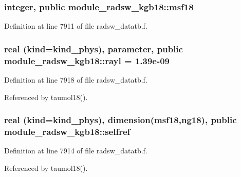\subsubsection[{\texorpdfstring{msf18}{msf18}}]{\setlength{\rightskip}{0pt plus 5cm}integer, public module\+\_\+radsw\+\_\+kgb18\+::msf18}\hypertarget{namespacemodule__radsw__kgb18_a1d74002f71710887e45df89d3897a10a}{}\label{namespacemodule__radsw__kgb18_a1d74002f71710887e45df89d3897a10a}


Definition at line 7911 of file radsw\+\_\+datatb.\+f.

\subsubsection[{\texorpdfstring{rayl}{rayl}}]{\setlength{\rightskip}{0pt plus 5cm}real (kind=kind\+\_\+phys), parameter, public module\+\_\+radsw\+\_\+kgb18\+::rayl = 1.\+39e-\/09}\hypertarget{namespacemodule__radsw__kgb18_a9cd3f07e259e4982c7ef2889fee6cccb}{}\label{namespacemodule__radsw__kgb18_a9cd3f07e259e4982c7ef2889fee6cccb}


Definition at line 7918 of file radsw\+\_\+datatb.\+f.



Referenced by taumol18().

\subsubsection[{\texorpdfstring{selfref}{selfref}}]{\setlength{\rightskip}{0pt plus 5cm}real (kind=kind\+\_\+phys), dimension({\bf msf18},ng18), public module\+\_\+radsw\+\_\+kgb18\+::selfref}\hypertarget{namespacemodule__radsw__kgb18_a488f807878d909b8f69457b0d7d8ac6a}{}\label{namespacemodule__radsw__kgb18_a488f807878d909b8f69457b0d7d8ac6a}


Definition at line 7914 of file radsw\+\_\+datatb.\+f.



Referenced by taumol18().

